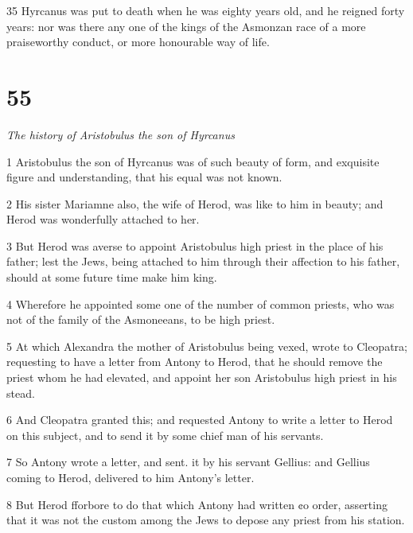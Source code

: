 \par 35 Hyrcanus was put to death when he was eighty years old, and he reigned forty years: nor was there any one of the kings of the Asmonzan race of a more praiseworthy conduct, or more honourable way of life. 

\chapter{55}

\par \textit{The history of Aristobulus the son of Hyrcanus}

\par 1 Aristobulus the son of Hyrcanus was of such beauty of form, and exquisite figure and understanding, that his equal was not known. 

\par 2 His sister Mariamne also, the wife of Herod, was like to him in beauty; and Herod was wonderfully attached to her. 

\par 3 But Herod was averse to appoint Aristobulus high priest in the place of his father; lest the Jews, being attached to him through their affection to his father, should at some future time make him king. 

\par 4 Wherefore he appointed some one of the number of common priests, who was not of the family of the Asmoneeans, to be high priest.

\par 5 At which Alexandra the mother of Aristobulus being vexed, wrote to Cleopatra; requesting to have a letter from Antony to Herod, that he should remove the priest whom he had elevated, and appoint her son Aristobulus high priest in his stead. 

\par 6 And Cleopatra granted this; and requested Antony to write a letter to Herod on this subject, and to send it by some chief man of his servants. 

\par 7 So Antony wrote a letter, and sent. it by his servant Gellius: and Gellius coming to Herod, delivered to him Antony’s letter. 

\par 8 But Herod fforbore to do that which Antony had written ¢o order, asserting that it was not the custom among the Jews to depose any priest from his station. 

